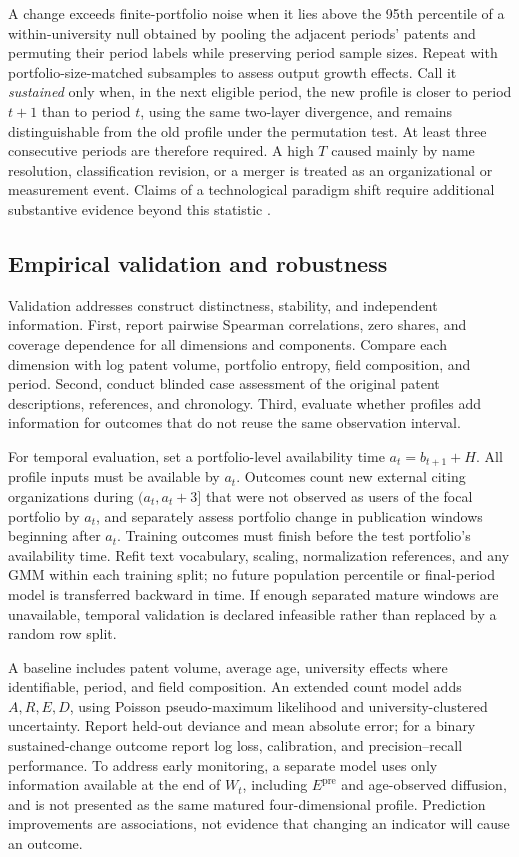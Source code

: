 A change exceeds finite-portfolio noise when it lies above the 95th percentile
of a within-university null obtained by pooling the adjacent periods' patents
and permuting their period labels while preserving period sample sizes.
Repeat with portfolio-size-matched subsamples to assess output growth effects.
Call it \emph{sustained} only when, in the next eligible period, the new profile
is closer to period $t+1$ than to period $t$, using the same two-layer divergence,
and remains distinguishable from the old profile under the permutation test.
At least three consecutive periods are therefore required. A high $T$ caused
mainly by name resolution, classification revision, or a merger is treated as
an organizational or measurement event. Claims of a technological paradigm
shift require additional substantive evidence beyond this statistic
\citep{dosi1982,funk2017}.

\subsection{Empirical validation and robustness}\label{sec:validation}
Validation addresses construct distinctness, stability, and independent information.
First, report pairwise Spearman correlations, zero shares, and coverage dependence
for all dimensions and components. Compare each dimension with log patent
volume, portfolio entropy, field composition, and period. Second, conduct blinded
case assessment of the original patent descriptions, references, and chronology.
Third, evaluate whether profiles add information for outcomes that do not reuse
the same observation interval.

For temporal evaluation, set a portfolio-level availability time
$a_t=b_{t+1}+H$. All profile inputs must be available by $a_t$. Outcomes count
new external citing organizations during $(a_t,a_t+3]$ that were not observed
as users of the focal portfolio by $a_t$, and separately assess portfolio change
in publication windows beginning after $a_t$. Training outcomes must finish
before the test portfolio's availability time. Refit text vocabulary, scaling,
normalization references, and any GMM within each training split; no future
population percentile or final-period model is transferred backward in time.
If enough separated mature windows are unavailable, temporal validation is
declared infeasible rather than replaced by a random row split.

A baseline includes patent volume, average age, university effects where
identifiable, period, and field composition. An extended count model adds
$A,R,E,D$, using Poisson pseudo-maximum likelihood and university-clustered
uncertainty. Report held-out deviance and mean absolute error; for a binary
sustained-change outcome report log loss, calibration, and precision--recall
performance. To address early monitoring, a separate model uses only information
available at the end of $W_t$, including $E^{\mathrm{pre}}$ and age-observed
diffusion, and is not presented as the same matured four-dimensional profile.
Prediction improvements are associations, not evidence that changing an
indicator will cause an outcome.

